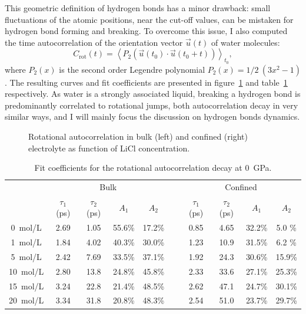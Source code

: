\documentclass[thesis]{subfiles}
\begin{document}
\newpage
This geometric definition of hydrogen bonds has a minor drawback: small
fluctuations of the atomic positions, near the cut-off values, can be mistaken
for hydrogen bond forming and breaking. To overcome this issue, I also
computed the time autocorrelation of the orientation vector $\vec u(t)$ of
water molecules:
\[C_{\text{rot}}(t) = \left\langle P_2(\vec u(t_0) \cdot \vec u(t_0 + t)) \right\rangle_{t_0} ,\]
where $P_2(x)$ is the second order Legendre polynomial $P_2(x) = 1/2\ (3x^2 -
1)$\cite{Fogarty2014}. The resulting curves and fit coefficients are presented
in figure~\ref{fig:licl-zif:rotcf} and table~\ref{table:licl-zif:rotcf}
respectively. As water is a strongly associated liquid, breaking a hydrogen bond
is predominantly correlated to rotational jumps, both autocorrelation decay in
very similar ways, and I will mainly focus the discussion on hydrogen bonds
dynamics.

\begin{figure}[ht]
    \centering
    
    \caption{Rotational autocorrelation in bulk (left) and confined (right)
    electrolyte as function of LiCl concentration.}
    \label{fig:licl-zif:rotcf}
\end{figure}

\begin{table}[ht]
    \caption{Fit coefficients for the rotational autocorrelation decay at \SI{0}{GPa}.}
    \label{table:licl-zif:rotcf}
    \centering
    \begin{tabular}{c c c c c c c c c c}
        \toprule
        \multicolumn{1}{c}{~} & \multicolumn{4}{c}{Bulk}                          &~& \multicolumn{4}{c}{Confined} \\
        \multicolumn{1}{c}{~} & $\tau_1$ (ps) & $\tau_2$ (ps) & $A_1$   & $A_2$   &~& $\tau_1$ (ps) & $\tau_2$ (ps) & $A_1$   & $A_2$   \\
        \midrule
        \SI{0}{mol/L}         &    2.69       &    1.05       & 55.6\% & 17.2\% &~&    0.85       &     4.65      &  32.2\% &  5.0  \% \\
        \SI{1}{mol/L}         &    1.84       &    4.02       & 40.3\% & 30.0\% &~&    1.23       &     10.9      &  31.5\% &  6.2  \% \\
        \SI{5}{mol/L}         &    2.42       &    7.69       & 33.5\% & 37.1\% &~&    1.92       &     24.3      &  30.6\% &  15.9\% \\
        \SI{10}{mol/L}        &    2.80       &    13.8       & 24.8\% & 45.8\% &~&    2.33       &     33.6      &  27.1\% &  25.3\% \\
        \SI{15}{mol/L}        &    3.24       &    22.8       & 21.4\% & 48.5\% &~&    2.62       &     47.1      &  24.7\% &  30.1\% \\
        \SI{20}{mol/L}        &    3.34       &    31.8       & 20.8\% & 48.3\% &~&    2.54       &     51.0      &  23.7\% &  29.7\% \\
        \bottomrule
    \end{tabular}
\end{table}
\end{document}
